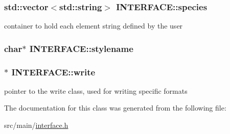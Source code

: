 \subsubsection[{species}]{\setlength{\rightskip}{0pt plus 5cm}std\+::vector$<$std\+::string$>$ I\+N\+T\+E\+R\+F\+A\+C\+E\+::species}\label{class_i_n_t_e_r_f_a_c_e_aa55e1e42a1d2309638398bb640fbf74f}


container to hold each element string defined by the user 

\hypertarget{class_i_n_t_e_r_f_a_c_e_afb94f9450b89e70f8b2396ec80f339da}{}
\subsubsection[{stylename}]{\setlength{\rightskip}{0pt plus 5cm}char$\ast$ I\+N\+T\+E\+R\+F\+A\+C\+E\+::stylename\hspace{0.3cm}{\ttfamily [private]}}\label{class_i_n_t_e_r_f_a_c_e_afb94f9450b89e70f8b2396ec80f339da}
\hypertarget{class_i_n_t_e_r_f_a_c_e_a6e215284876b2bb79090fd3a210a40b0}{}
\subsubsection[{write}]{$\ast$ I\+N\+T\+E\+R\+F\+A\+C\+E\+::write}\label{class_i_n_t_e_r_f_a_c_e_a6e215284876b2bb79090fd3a210a40b0}


pointer to the write class, used for writing specific formats 



The documentation for this class was generated from the following file\+:\begin{DoxyCompactItemize}
\item 
src/main/\hyperlink{interface_8h}{interface.\+h}\end{DoxyCompactItemize}
